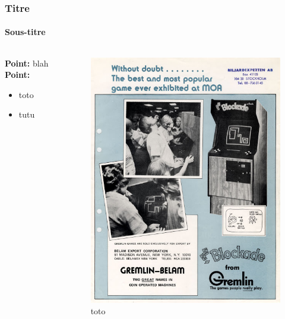 \documentclass[10pt]{beamer}
\begin{document}
\begin{frame}
\frametitle{Titre}
\framesubtitle{Sous-titre}   
\begin{columns}[T]
\begin{column}{0.70\textwidth}
\footnotesize
\textbf{Point:} blah 
\vspace{0.5cm}
\textbf{Point:}  
\begin{itemize}
\footnotesize
\item toto
\item tutu
\end{itemize}
\end{column}
\begin{column}{0.24\textwidth}
\begin{figure}
\centering
\vspace{-1cm}\hspace{-0.6cm}
\includegraphics[width=1\textwidth]{blockade.jpg}
\caption*{\tiny toto}
\end{figure}
\end{column}
\end{columns}
\end{frame}
\end{document}
